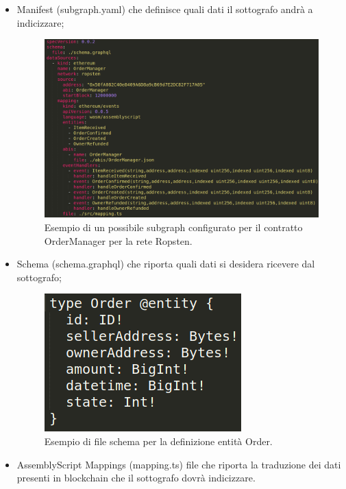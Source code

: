 \begin{itemize}
 \item Manifest (subgraph.yaml) che definisce quali dati il sottografo andrà a indicizzare;

 \begin{figure}[H]
    \centering
    \includegraphics[scale=0.3]{immagini/subgraf.png}
    \caption{Esempio di un possibile subgraph configurato per il contratto OrderManager per la rete Ropsten.}
 \end{figure}


 \item Schema (schema.graphql) che riporta quali dati si desidera ricevere dal sottografo;

 \begin{figure}[H]
    \centering
    \includegraphics[scale=0.4]{immagini/schema.png}
    \caption{Esempio di file schema per la definizione entità Order.}
 \end{figure}

 \item AssemblyScript Mappings (mapping.ts) file che riporta la traduzione dei dati presenti in blockchain che il sottografo dovrà indicizzare.


\end{itemize}
